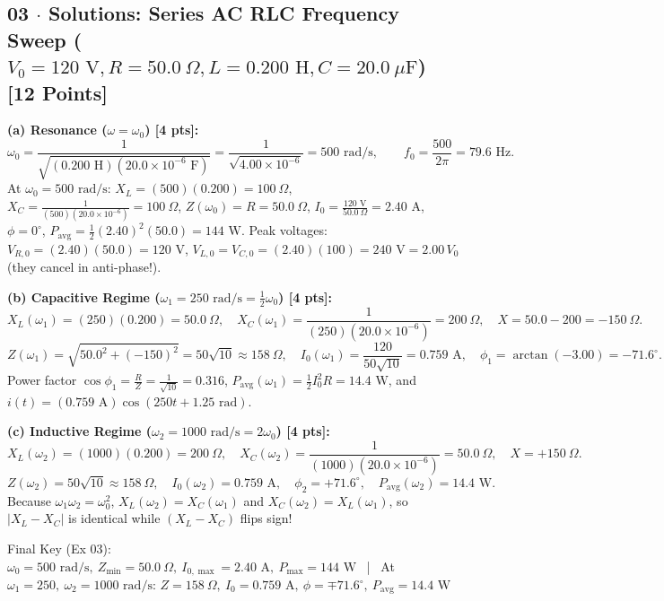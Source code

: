 \documentclass[10pt,letterpaper]{article}
\begin{document}
\newpage



\subsection*{03 $\cdot$ Solutions: Series AC RLC Frequency Sweep ($V_0=120\text{ V}, R=50.0\ \Omega, L=0.200\text{ H}, C=20.0\ \mu\text{F}$) \hfill [12 Points]}


  \textbf{(a) Resonance ($\omega = \omega_0$) [4 pts]:}
  $$\omega_0 = \frac{1}{\sqrt{(0.200\text{ H})(20.0\times 10^{-6}\text{ F})}} = \frac{1}{\sqrt{4.00\times 10^{-6}}} = 500\text{ rad/s}, \qquad f_0 = \frac{500}{2\pi} = 79.6\text{ Hz}.$$
  At $\omega_0 = 500\text{ rad/s}$: $X_L = (500)(0.200) = 100\ \Omega$, $X_C = \frac{1}{(500)(20.0\times 10^{-6})} = 100\ \Omega$, $Z(\omega_0) = R = 50.0\ \Omega$, $I_0 = \frac{120\text{ V}}{50.0\ \Omega} = 2.40\text{ A}$, $\phi = 0^\circ$, $P_{\text{avg}} = \frac{1}{2}(2.40)^2(50.0) = 144\text{ W}$. Peak voltages: $V_{R,0} = (2.40)(50.0) = 120\text{ V}$, $V_{L,0} = V_{C,0} = (2.40)(100) = 240\text{ V} = 2.00\,V_0$ (they cancel in anti-phase!).

  \textbf{(b) Capacitive Regime ($\omega_1 = 250\text{ rad/s} = \frac{1}{2}\omega_0$) [4 pts]:}
  $$X_L(\omega_1) = (250)(0.200) = 50.0\ \Omega, \quad X_C(\omega_1) = \frac{1}{(250)(20.0\times 10^{-6})} = 200\ \Omega, \quad X = 50.0 - 200 = -150\ \Omega.$$
  $$Z(\omega_1) = \sqrt{50.0^2 + (-150)^2} = 50\sqrt{10} \approx 158\ \Omega, \quad I_0(\omega_1) = \frac{120}{50\sqrt{10}} = 0.759\text{ A}, \quad \phi_1 = \arctan(-3.00) = -71.6^\circ.$$
  Power factor $\cos\phi_1 = \frac{R}{Z} = \frac{1}{\sqrt{10}} = 0.316$, $P_{\text{avg}}(\omega_1) = \frac{1}{2}I_0^2 R = 14.4\text{ W}$, and $i(t) = (0.759\text{ A})\cos(250 t + 1.25\text{ rad})$.

  \textbf{(c) Inductive Regime ($\omega_2 = 1000\text{ rad/s} = 2\omega_0$) [4 pts]:}
  $$X_L(\omega_2) = (1000)(0.200) = 200\ \Omega, \quad X_C(\omega_2) = \frac{1}{(1000)(20.0\times 10^{-6})} = 50.0\ \Omega, \quad X = +150\ \Omega.$$
  $$Z(\omega_2) = 50\sqrt{10} \approx 158\ \Omega, \quad I_0(\omega_2) = 0.759\text{ A}, \quad \phi_2 = +71.6^\circ, \quad P_{\text{avg}}(\omega_2) = 14.4\text{ W}.$$
  Because $\omega_1 \omega_2 = \omega_0^2$, $X_L(\omega_2) = X_C(\omega_1)$ and $X_C(\omega_2) = X_L(\omega_1)$, so $|X_L - X_C|$ is identical while $(X_L - X_C)$ flips sign!

Final Key (Ex 03): ~ $\omega_0 = 500\text{ rad/s},\ Z_{\min}=50.0\ \Omega,\ I_{0,\max}=2.40\text{ A},\ P_{\max}=144\text{ W}$ ~|~ At $\omega_1=250,\ \omega_2=1000\text{ rad/s}$: $Z=158\ \Omega,\ I_0=0.759\text{ A},\ \phi=\mp 71.6^\circ,\ P_{\text{avg}}=14.4\text{ W}$
\end{document}
